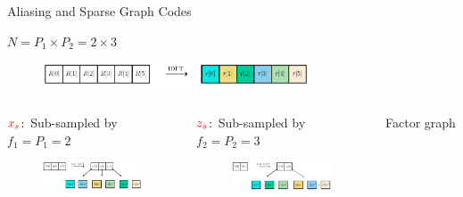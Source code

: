 \documentclass[10pt,xcolor=table]{beamer}
\begin{document}
	\begin{frame}{Aliasing and Sparse Graph Codes}
	
	\begin{block}{$N = P_1 \times P_2 = 2 \times 3$}
		\begin{figure}[t]
			\centering
			\includegraphics[width=3.1in]{X_DFT}
		\end{figure}
	\end{block}
	
	\begin{columns}
		
		\begin{block}{{\small $\color{red}x_s$:\ Sub-sampled by $f_1=P_1=2$}}
			\begin{figure}[t]
				\centering
				\includegraphics[width=2.3in]{Xs_shift}
			\end{figure}
		\end{block}
		
		\begin{block}{{\small$\color{red}z_s$:\ Sub-sampled by $f_2=P_2=3$}}
			\begin{figure}[t]
				\centering
				\includegraphics[width=2.3in]{Zs_shift}
			\end{figure}
		\end{block}
		
		\begin{block}{\small Factor graph}
			
			\begin{figure}[t]
				\begin{center}
					\resizebox{1.0\textwidth}{!}{}
					\end{center}
				\end{figure}
		\end{block}
	\end{columns}
\end{frame}
	
\end{document}
